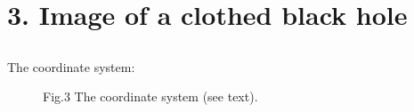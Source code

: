 \chapter{3. Image of a clothed black hole}
\pagebreak[4]

\section{}
\begin{tcolorbox}
The coordinate system:
\end{tcolorbox}

\begin{figure}[H]

\caption{Fig.3 The coordinate system (see text).}
\label{fig:fig_3}
\end{figure}
